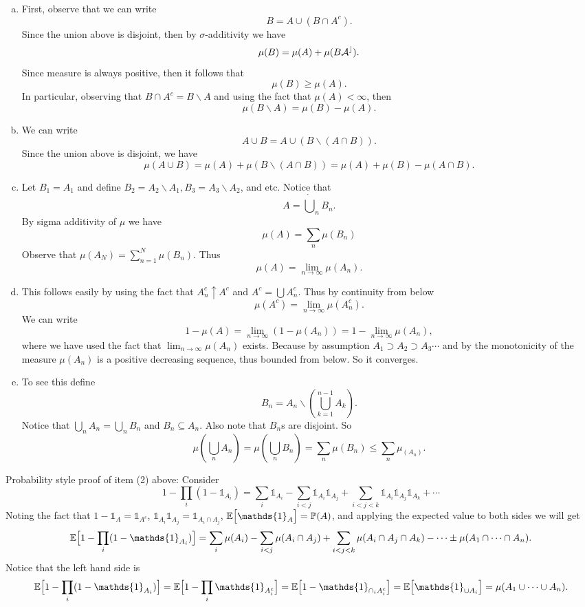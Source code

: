 \begin{solution}
	\begin{enumerate}[(a)]
		\item 
		First, observe that we can write
		\[ B = A \cup (B\cap A^c). \]
		Since the union above is disjoint, then by $ \sigma $-additivity we have
		\[ \mu(B) = \mu(A) + \mu(B\cal A^c). \]
		Since measure is always positive, then it follows that
		\[ \mu(B) \geq \mu(A). \]
		In particular, observing that $ B\cap A^c = B\backslash A $ and using the fact that $ \mu(A)<\infty $, then
		\[ \mu(B\backslash A) = \mu(B) - \mu(A). \]
		\item We can write
		\[ A \cup B = A \cup (B \backslash (A\cap B)). \]
		Since the union above is disjoint, we have
		\[ \mu(A\cup B) = \mu(A) + \mu(B\backslash (A\cap B)) = \mu(A) + \mu(B) - \mu(A\cap B). \]
		\item Let $ B_1 = A_1 $ and define $ B_2 = A_2\backslash A_1, B_3 = A_3 \backslash A_2 $, and etc. Notice that 
		\[ A = \dot\bigcup_n B_n. \]
		By sigma additivity of $ \mu $ we have
		\[ \mu(A) = \sum_n \mu(B_n) \]
		Observe that $ \mu(A_N) = \sum_{n=1}^N \mu(B_n) $. Thus
		\[ \mu(A) = \lim_{n\to\infty} \mu(A_n). \]
		\item This follows easily by using the fact that $ A_n^c \uparrow A^c $ and $ A^c = \bigcup A_n^c $. Thus by continuity from below
		\[ \mu(A^c) = \lim_{n\to\infty}\mu(A^c_n). \]
		We can write
		\[ 1 - \mu(A) = \lim_{n\to\infty}(1 - \mu(A_n)) = 1 - \lim_{n\to\infty}\mu(A_n), \]
		where we have used the fact that $ \lim_{n\to\infty}\mu(A_n) $ exists. Because by assumption $ A_1 \supset A_2 \supset A_3 \cdots $ and by the monotonicity of the measure $ \mu(A_n) $ is a positive decreasing sequence, thus bounded from below. So it converges. 
		
		\item To see this define
		\[ B_n = A_n \backslash (\bigcup_{k=1}^{n-1} A_k). \]
		Notice that $ \bigcup_n A_n = \bigcup_n B_n $ and $ B_n \subseteq A_n $. Also note that $ B_n $s are disjoint. So
		\[ \mu(\bigcup_n A_n) = \mu(\bigcup_n B_n) = \sum_n \mu(B_n) \leq \sum_n \mu_(A_n). \]
	\end{enumerate}
\end{solution}


\begin{remark}
	Probability style proof of item (2) above: Consider
	\[ 1 - \prod_{i}(1 - \mathds{1}_{A_i}) = \sum_i \mathds{1}_{A_i} - \sum_{i<j}\mathds{1}_{A_i}\mathds{1}_{A_j} + \sum_{i<j<k}\mathds{1}_{A_i}\mathds{1}_{A_j}\mathds{1}_{A_k}+\cdots  \]
	Noting the fact that $ 1 - \mathds{1}_{A} = \mathds{1}_{A^c} $, $ \mathds{1}_{A_i}\mathds{1}_{A_j} = \mathds{1}_{A_i\cap A_j} $, $ \E{\mathds{1}_{A}} = \prob(A) $, and applying the expected value to both sides we will get
	\[ \E{1 - \prod_i (1-\mathds{1}_{A_i})} = \sum_i \mu(A_i) - \sum_{i<j}\mu(A_i\cap A_j) + \sum_{i<j<k}\mu(A_i\cap A_j \cap A_k) - \cdots \pm \mu(A_1\cap\cdots\cap A_n). \]
	Notice that the left hand side is
	\[ \E{1 - \prod_i (1-\mathds{1}_{A_i})} = \E{1 - \prod_i \mathds{1}_{A_i^c}} = \E{1 - \mathds{1}_{\cap_i A_i^c}} = \E{\mathds{1}_{\cup A_i}} = \mu(A_1\cup\cdots\cup A_n). \]
\end{remark}



